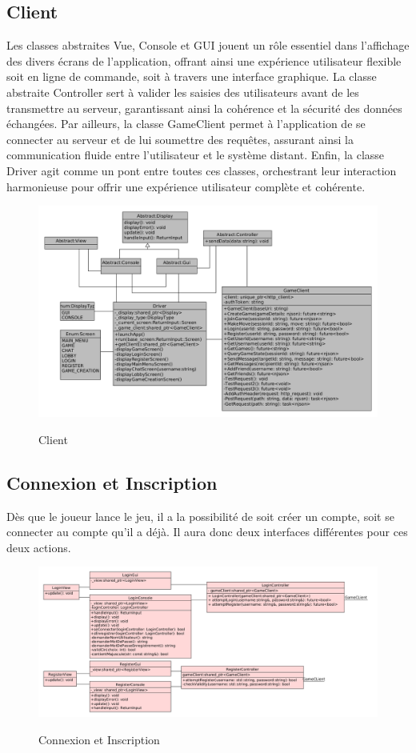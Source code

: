 \documentclass[../design_fonctionnement_sys.tex]{subfiles}
\begin{document}
\subsection{Client}
Les classes abstraites Vue, Console et GUI jouent un rôle essentiel dans l'affichage des divers écrans de l'application, 
offrant ainsi une expérience utilisateur flexible soit en ligne de commande, soit à travers une interface graphique. 
La classe abstraite Controller sert à valider les saisies des utilisateurs avant de les transmettre au serveur, 
garantissant ainsi la cohérence et la sécurité des données échangées. 
Par ailleurs, la classe GameClient permet à l'application de se connecter au serveur et de lui soumettre des requêtes, 
assurant ainsi la communication fluide entre l'utilisateur et le système distant. 
Enfin, la classe Driver agit comme un pont entre toutes ces classes, orchestrant leur interaction harmonieuse pour offrir une expérience utilisateur complète et cohérente.
\begin{figure}[H]
    \centering
    \includegraphics[scale=0.4]{img_design/client_design.png}
    \label{fig:client}
    \caption{Client}
\end{figure}

\newpage
\subsection{Connexion et Inscription}
Dès que le joueur lance le jeu, il a la possibilité de soit créer un compte, soit se connecter au compte qu'il a déjà. 
Il aura donc deux interfaces différentes pour ces deux actions.
\begin{figure}[H]
    \centering
    \includegraphics[scale=0.3]{img_design/4.2_login_register_design.png}
    \label{fig:seq_match_server}
    \caption{Connexion et Inscription}
\end{figure}
\end{document}
